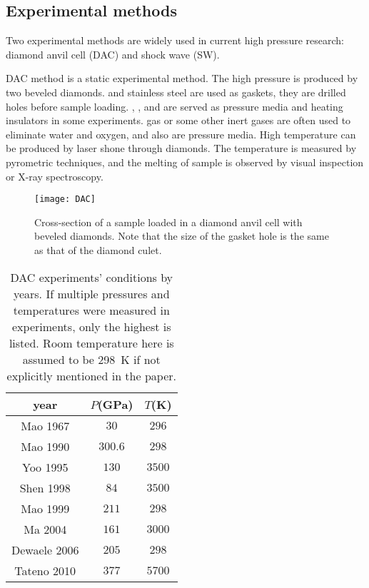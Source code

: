 
\subsection{Experimental methods}
\label{ssec:exp}

Two experimental methods are widely used in current high pressure research:
diamond anvil cell (DAC) and shock wave (SW).

DAC method is a static experimental method. The high pressure is produced by two beveled diamonds.  and stainless steel are used as gaskets, they are drilled holes before sample loading.
, , and  are served as pressure media and heating insulators in some experiments\cite{Anonymous:2004gu}.
 gas or some other inert gases are often used to eliminate water
and oxygen, and also are pressure media.
High temperature can be produced by laser shone through diamonds.
The temperature is measured by pyrometric techniques,
and the melting of sample is observed by
visual inspection or X-ray spectroscopy\cite{Sola:2009dw}.

\begin{figure}[h]
	\centering
	\texttt{[image: DAC]}
	\caption{Cross-section of a sample loaded in a diamond anvil cell with beveled diamonds. Note that the size of the gasket hole is the same as that of the diamond culet\cite{Anonymous:2004gu}.}
	\label{fig:dac}
\end{figure}

\begin{table}[htbp]
	\centering
	\caption{DAC experiments' conditions by years. If multiple pressures
		and temperatures were measured in experiments,
		only the highest is listed. Room temperature here is assumed to be
		\SI{298}{\kelvin} if not explicitly mentioned in the paper.}
	\begin{tabular}{ccc}
		\toprule
		year                              & $P$(\si{\giga\pascal}) & $T$(\si{\kelvin}) \\
		\midrule
		Mao 1967\cite{Mao:1967iz}         & $30$                   & $296$             \\
		Mao 1990\cite{Mao:1990ev}         & $ 300.6 $              & $ 298 $           \\
		Yoo 1995\cite{Yoo:1995kx}         & $130$                  & $3500$            \\
		Shen 1998\cite{Shen:1998bt}       & $ 84 $                 & $ 3500 $          \\
		Mao 1999\cite{Mao:1999fg}         & $ 211 $                & $ 298 $           \\
		Ma 2004\cite{Anonymous:2004gu}    & $ 161 $                & $ 3000 $          \\
		Dewaele 2006\cite{Dewaele:2006ha} & $ 205 $                & $ 298 $           \\
		Tateno 2010\cite{Tateno:2010io}   & $ 377 $                & $ 5700 $          \\
		\bottomrule
	\end{tabular}%
	\label{tab:dac}%
\end{table}%

